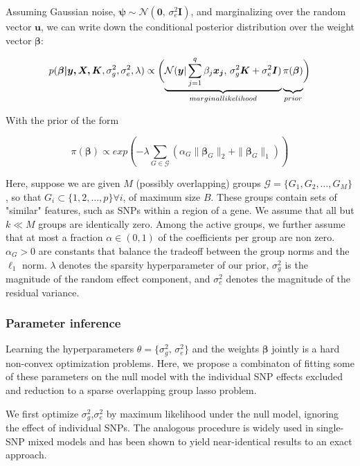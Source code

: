 \documentclass[11pt]{article}
\theoremstyle{plain}
\theoremstyle{definition}
\theoremstyle{remark}
\begin{document}
Assuming Gaussian noise, $\bm\psi\sim\mathcal{N}(\bm{0},\,\sigma_e^2\bm{I})$, and marginalizing over the random vector $\bm{u}$, we can write down the conditional posterior distribution over the weight vector $\bm\beta$:

\begin{equation}
\label{eq:2}
p(\bm{\beta|y,X,K},\sigma_g^2,\sigma_e^2,\lambda)\propto
\biggl(
\underbrace{\mathcal{N}(\bm{y}|\sum_{j=1}^q\beta_j\bm{x_j},\,\sigma_g^2\bm{K}+\sigma_e^2\bm{I})}_{marginal likelihood}
\underbrace{\vphantom{\sum_{j=1}^q}\pi(\bm{\beta})}_{prior}
\biggr)
\end{equation}

With the prior of the form

\begin{equation}
\label{eq:3}
\pi(\bm{\beta})\propto exp(-\lambda\sum_{G\in\mathcal{G}}(\alpha_{G}\parallel\bm\beta_G\parallel_2+\parallel\bm\beta_G\parallel_1))
\end{equation}

Here, suppose we are given $M$ (possibly overlapping) groups $\mathcal{G}=\{G_1,G_2,\ldots,G_M\}$, so that $G_i\subset \{1,2,\ldots,p\}\forall i$, of maximum size $B$. These groups contain sets of "similar" features, such as SNPs within a region of a gene. We assume that all but $k\ll M$ groups are identically zero. Among the active groups, we further assume that at most a fraction $\alpha \in (0,1)$ of the coefficients per group are non zero. $\alpha_G>0$ are constants that balance the tradeoff between the group norms and the $\ell_1$ norm. $\lambda$ denotes the sparsity hyperparameter of our prior, $\sigma_g^2$ is the magnitude of the random effect component, and $\sigma_e^2$ denotes the magnitude of the residual variance.

\subsubsection{Parameter inference}
Learning the hyperparameters $\mathcal{\theta}=\{\sigma_g^2,\,\sigma_e^2\}$ and the weights $\bm\beta$ jointly is a hard non-convex optimization problems. Here, we propose a combinaton of fitting some of these parameters on the null model with the individual SNP effects excluded and reduction to a sparse overlapping group lasso problem.

We first optimize $\sigma_g^2$,$\sigma_e^2$ by maximum likelihood under the null model, ignoring the effect of individual SNPs. The analogous procedure is widely used in single-SNP mixed models and has been shown to yield near-identical results to an exact approach.
\end{document}
